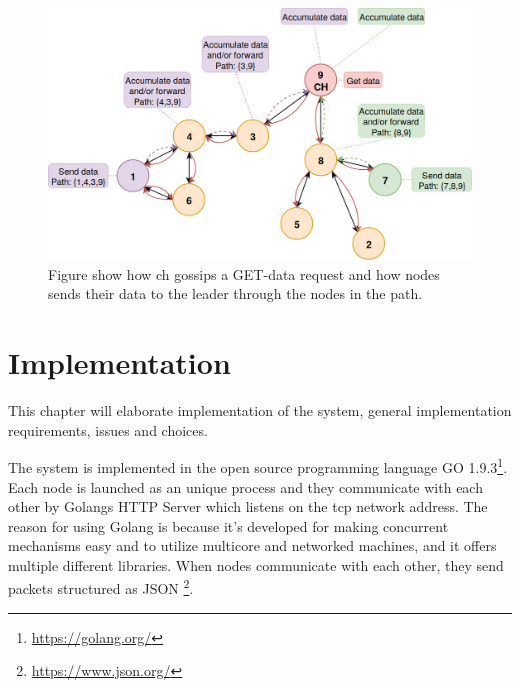 \documentclass[USenglish]{uit-thesis}
\begin{document}

\begin{figure}
\centering
\includegraphics[width=\textwidth]{gatherSendData1.png}
\caption{Figure show how \gls{ch} gossips a GET-data request and how  nodes sends their data to the leader through the nodes in the path.}
\label{fig:gaterSendData}
\end{figure}



\chapter{Implementation} \label{chap:implementation}
\glsresetall

This chapter will elaborate implementation of the system, general implementation requirements, issues and choices. 

The system is implemented in the open source programming language GO 1.9.3\footnote{\url{https://golang.org/}}. Each node is launched as an unique process and they communicate with each other by Golangs HTTP Server which listens on the \gls{tcp} network address. The reason for using Golang is because it's developed for making concurrent mechanisms easy and to utilize multicore and networked machines, and it offers multiple different libraries. When nodes communicate with each other, they send packets structured as JSON \footnote{\url{https://www.json.org/}}.
\end{document}
